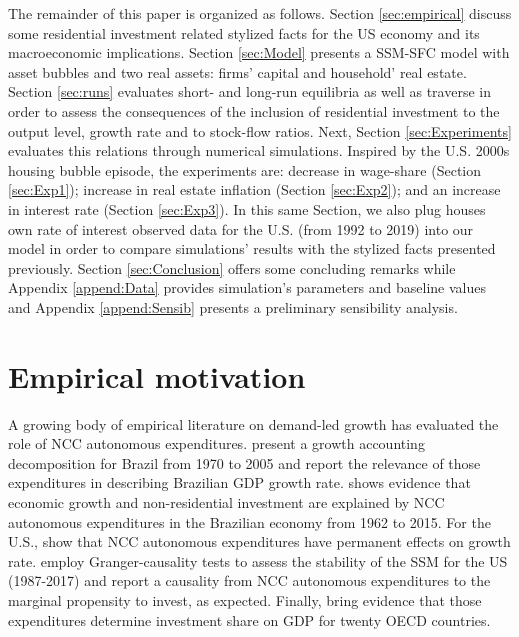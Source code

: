 \documentclass[12pt]{article}
\begin{document}
The remainder of this paper is organized as follows.
Section \ref{sec:empirical} discuss some residential investment related stylized facts for the US economy and its macroeconomic implications.
Section \ref{sec:Model} presents a SSM-SFC model  with asset bubbles and two real assets: firms' capital and household' real estate. 
Section \ref{sec:runs} evaluates short- and long-run equilibria as well as traverse in order to assess the consequences  of the inclusion of residential investment to the output level, growth rate and to stock-flow ratios.
Next, Section \ref{sec:Experiments} evaluates this relations through numerical simulations.
Inspired by the U.S. 2000s housing bubble episode, the experiments are: decrease in wage-share (Section \ref{sec:Exp1}); increase in real estate inflation (Section \ref{sec:Exp2}); and an increase in interest rate (Section \ref{sec:Exp3}).
In this same Section, we also plug houses own rate of interest observed data for the U.S. (from 1992 to 2019) into our model in order to compare simulations' results with the stylized facts presented previously.
Section \ref{sec:Conclusion} offers some concluding remarks while Appendix \ref{append:Data} provides simulation's parameters and baseline values and Appendix \ref{append:Sensib} presents a preliminary sensibility analysis.


\section{Empirical motivation}
\label{sec:orgaa5e0f1}
\label{sec:empirical}
A growing body of empirical literature on demand-led growth has evaluated the role of NCC autonomous expenditures.
\textcite{freitas_pattern_2013} present a growth accounting decomposition for Brazil from 1970 to 2005 and report the relevance of those expenditures in describing Brazilian GDP growth rate.
\textcite{braga_investment_2020} shows evidence that economic growth and non-residential investment are explained by NCC autonomous expenditures in the Brazilian economy from 1962 to 2015.
For the U.S., \textcite{girardi_long-run_2016} show that NCC autonomous expenditures have permanent effects on growth rate.
\textcite{haluska_growth_2020} employ Granger-causality tests to assess the stability of the SSM for the US (1987-2017) and report a causality from NCC autonomous expenditures to the marginal propensity to invest, as expected.
Finally, \textcite{girardi_autonomous_2020} bring evidence that those expenditures determine investment share on GDP for twenty OECD countries.
\end{document}
